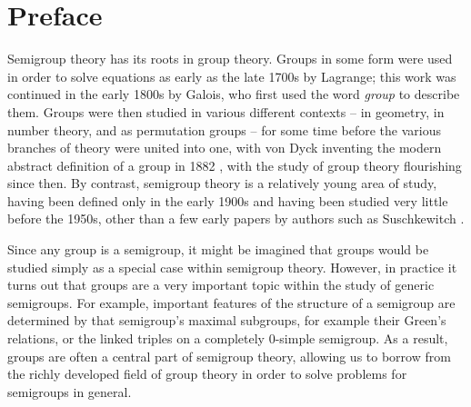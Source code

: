 \chapter*{Preface}

Semigroup theory has its roots in group theory.  Groups in some form were used
in order to solve equations as early as the late 1700s by Lagrange; this work
was continued in the early 1800s by Galois, who first used the word
\textit{group} to describe them.  Groups were then studied in various different
contexts -- in geometry, in number theory, and as permutation groups -- for some
time before the various branches of theory were united into one, with von Dyck
inventing the modern abstract definition of a group in 1882 \cite{dyck_1882},
with the study of group theory flourishing since then.  By contrast, semigroup
theory is a relatively young area of study, having been defined only in the
early 1900s and having been studied very little before the 1950s, other than a
few early papers by authors such as Suschkewitch \cite{susch_1928}.

Since any group is a semigroup, it might be imagined that groups would be
studied simply as a special case within semigroup theory.  However, in practice
it turns out that groups are a very important topic within the study of generic
semigroups.  For example, important features of the structure of a semigroup are
determined by that semigroup's maximal subgroups, for example their Green's
relations, or the linked triples on a completely 0-simple semigroup.  As a
result, groups are often a central part of semigroup theory, allowing us to
borrow from the richly developed field of group theory in order to solve
problems for semigroups in general.

